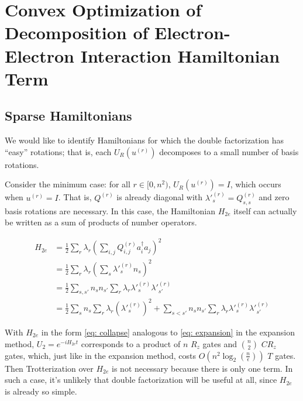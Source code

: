 

\chapter{Convex Optimization of Decomposition of Electron-Electron Interaction Hamiltonian Term}

\section{Sparse Hamiltonians}

We would like to identify Hamiltonians for which the double factorization has ``easy'' rotations; that is, each $U_R(u^{(r)})$ decomposes to a small number of basis rotations.

Consider the minimum case: for all $r \in [0, n^2)$, $U_R(u^{(r)}) = I$, which occurs when $u^{(r)} = I$. That is, $Q^{(r)}$ is already diagonal with $\lambda'^{(r)}_s = Q^{(r)}_{s, s}$ and zero basis rotations are necessary. In this case, the Hamiltonian $H_{2e}$ itself can actually be written as a sum of products of number operators. 

\begin{equation}
    \begin{split}
        H_{2e} &= \frac{1}{2}\sum_r\lambda_r\left(\sum_{i,j} Q^{(r)}_{i, j}a^\dag_ia_j\right)^2 \\
        &= \frac{1}{2}\sum_r\lambda_r(\sum_{s} \lambda'^{(r)}_sn_s)^2 \\
        &= \frac{1}{2}\sum_{s, s'} n_sn_{s'}\sum_r\lambda_r\lambda'^{(r)}_s\lambda'^{(r)}_{s'} \\
        &= \frac{1}{2}\sum_s n_s\sum_r\lambda_r(\lambda'^{(r)}_s)^2 + \sum_{s < s'} n_sn_{s'}\sum_r\lambda_r\lambda'^{(r)}_s\lambda'^{(r)}_{s'} \label{eq: collapse}
    \end{split}
\end{equation}

With $H_{2e}$ in the form \eqref{eq: collapse} analogous to \eqref{eq: expansion} in the expansion method, $U_2 = e^{-iH_{2e}t}$ corresponds to a product of $n$ $R_z$ gates and ${n \choose 2}$ $CR_z$ gates, which, just like in the expansion method, costs $O(n^2\log_2(\frac{n}{\epsilon}))$ $T$ gates. Then Trotterization over $H_{2e}$ is not necessary because there is only one term. In such a case, it's unlikely that double factorization will be useful at all, since $H_{2e}$ is already so simple.

